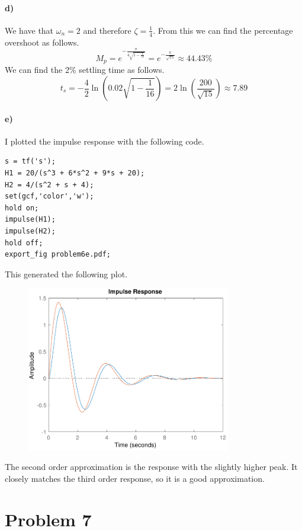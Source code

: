 \documentclass[12pt]{article}
\begin{document}
\paragraph{d)}

We have that \(\omega_n=2\) and therefore \(\zeta=\frac{1}{4}\). From this we can find the percentage overshoot as follows.
\[M_p=e^{-\frac{\pi}{4\sqrt{1-\frac{1}{16}}}}=e^{-\frac{\pi}{\sqrt{15}}}\approx44.43\%\]
We can find the 2\% settling time as follows.
\[t_s=-\frac{4}{2}\ln\left(0.02\sqrt{1-\frac{1}{16}}\right)=2\ln\left(\frac{200}{\sqrt{15}}\right)\approx7.89\]

\paragraph{e)}

I plotted the impulse response with the following code.
\begin{verbatim}
s = tf('s');
H1 = 20/(s^3 + 6*s^2 + 9*s + 20);
H2 = 4/(s^2 + s + 4);
set(gcf,'color','w');
hold on;
impulse(H1);
impulse(H2);
hold off;
export_fig problem6e.pdf;
\end{verbatim}
This generated the following plot.
\begin{figure}[H]
    \begin{center}
        \includegraphics[width=3.5in]{problem6e.pdf}
    \end{center}
\end{figure}
The second order approximation is the response with the slightly higher peak. It closely matches the third order response, so
it is a good approximation.

\section*{Problem 7}
\end{document}
